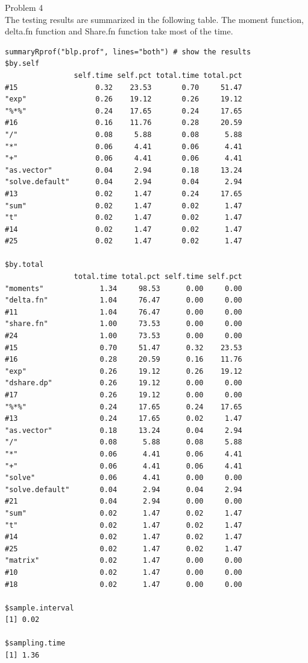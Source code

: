 \documentclass[12pt]{article}
\begin{document}
\newpage
\noindent Problem 4\\
\noindent The testing results are summarized in the following table. The moment function, delta.fn function and Share.fn function take most of the time.    
\begin{verbatim}
summaryRprof("blp.prof", lines="both") # show the results
$by.self
                self.time self.pct total.time total.pct
#15                  0.32    23.53       0.70     51.47
"exp"                0.26    19.12       0.26     19.12
"%*%"                0.24    17.65       0.24     17.65
#16                  0.16    11.76       0.28     20.59
"/"                  0.08     5.88       0.08      5.88
"*"                  0.06     4.41       0.06      4.41
"+"                  0.06     4.41       0.06      4.41
"as.vector"          0.04     2.94       0.18     13.24
"solve.default"      0.04     2.94       0.04      2.94
#13                  0.02     1.47       0.24     17.65
"sum"                0.02     1.47       0.02      1.47
"t"                  0.02     1.47       0.02      1.47
#14                  0.02     1.47       0.02      1.47
#25                  0.02     1.47       0.02      1.47

$by.total
                total.time total.pct self.time self.pct
"moments"             1.34     98.53      0.00     0.00
"delta.fn"            1.04     76.47      0.00     0.00
#11                   1.04     76.47      0.00     0.00
"share.fn"            1.00     73.53      0.00     0.00
#24                   1.00     73.53      0.00     0.00
#15                   0.70     51.47      0.32    23.53
#16                   0.28     20.59      0.16    11.76
"exp"                 0.26     19.12      0.26    19.12
"dshare.dp"           0.26     19.12      0.00     0.00
#17                   0.26     19.12      0.00     0.00
"%*%"                 0.24     17.65      0.24    17.65
#13                   0.24     17.65      0.02     1.47
"as.vector"           0.18     13.24      0.04     2.94
"/"                   0.08      5.88      0.08     5.88
"*"                   0.06      4.41      0.06     4.41
"+"                   0.06      4.41      0.06     4.41
"solve"               0.06      4.41      0.00     0.00
"solve.default"       0.04      2.94      0.04     2.94
#21                   0.04      2.94      0.00     0.00
"sum"                 0.02      1.47      0.02     1.47
"t"                   0.02      1.47      0.02     1.47
#14                   0.02      1.47      0.02     1.47
#25                   0.02      1.47      0.02     1.47
"matrix"              0.02      1.47      0.00     0.00
#10                   0.02      1.47      0.00     0.00
#18                   0.02      1.47      0.00     0.00

$sample.interval
[1] 0.02

$sampling.time
[1] 1.36
\end{verbatim}
\end{document}
